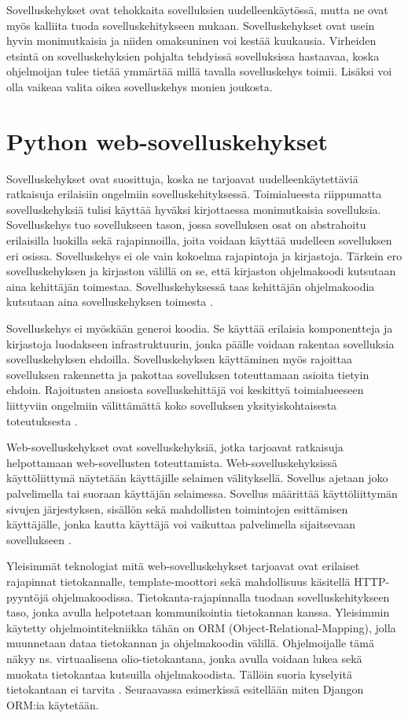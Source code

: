 \documentclass[utf8]{gradu3}
\begin{document}
Sovelluskehykset ovat tehokkaita sovelluksien uudelleenkäytössä, mutta ne ovat myös kalliita tuoda sovelluskehitykseen mukaan. Sovelluskehykset ovat usein hyvin monimutkaisia ja niiden omaksuninen voi kestää kuukausia. Virheiden etsintä on sovelluskehyksien pohjalta tehdyissä sovelluksissa hastaavaa, koska ohjelmoijan tulee tietää ymmärtää millä tavalla sovelluskehys toimii. Lisäksi voi olla vaikeaa valita oikea sovelluskehys monien joukosta. 

\chapter{Python web-sovelluskehykset}
Sovelluskehykset ovat suosittuja, koska ne tarjoavat uudelleenkäytettäviä ratkaisuja erilaisiin ongelmiin sovelluskehityksessä. Toimialueesta riippumatta sovelluskehyksiä tulisi käyttää hyväksi kirjottaessa monimutkaisia sovelluksia. Sovelluskehys tuo sovellukseen tason, jossa sovelluksen osat on abstrahoitu erilaisilla luokilla sekä rajapinnoilla, joita voidaan käyttää uudelleen sovelluksen eri osissa. Sovelluskehys ei ole vain kokoelma rajapintoja ja kirjastoja\parencite{towards_framework}. Tärkein ero sovelluskehyksen ja kirjaston välillä on se, että kirjaston ohjelmakoodi kutsutaan aina
kehittäjän toimestaa. Sovelluskehyksessä taas kehittäjän ohjelmakoodia kutsutaan aina sovelluskehyksen toimesta \parencite{pyramid_intr}.

Sovelluskehys ei myöskään generoi koodia. Se käyttää erilaisia komponentteja ja kirjastoja luodakseen infrastruktuurin, jonka päälle voidaan rakentaa sovelluksia sovelluskehyksen ehdoilla. Sovelluskehyksen käyttäminen myös rajoittaa sovelluksen rakennetta ja pakottaa sovelluksen toteuttamaan asioita tietyin ehdoin. Rajoitusten ansiosta sovelluskehittäjä voi keskittyä toimialueeseen liittyviin ongelmiin välittämättä koko sovelluksen yksityiskohtaisesta toteutuksesta \parencite{towards_framework}.

Web-sovelluskehykset ovat sovelluskehyksiä, jotka tarjoavat ratkaisuja helpottamaan web-sovellusten toteuttamista. Web-sovelluskehyksissä käyttöliittymä näytetään käyttäjille selaimen välityksellä. Sovellus ajetaan joko palvelimella tai suoraan käyttäjän selaimessa. Sovellus määrittää käyttöliittymän sivujen järjestyksen, sisällön sekä mahdollisten toimintojen esittämisen käyttäjälle, jonka kautta käyttäjä voi vaikuttaa palvelimella sijaitsevaan sovellukseen \parencite{vosloo}. 

Yleisimmät teknologiat mitä web-sovelluskehykset tarjoavat ovat erilaiset rajapinnat tietokannalle, template-moottori sekä mahdollisuus käsitellä HTTP-pyyntöjä ohjelmakoodissa. Tietokanta-rajapinnalla tuodaan sovelluskehitykseen taso, jonka avulla helpotetaan kommunikointia tietokannan kanssa. Yleisimmin käytetty ohjelmointitekniikka tähän on ORM (Object-Relational-Mapping), jolla muunnetaan dataa tietokannan ja ohjelmakoodin välillä. Ohjelmoijalle tämä näkyy ns. virtuaalisena olio-tietokantana, jonka avulla voidaan lukea sekä muokata tietokantaa kutsuilla ohjelmakoodista. Tällöin suoria kyselyitä tietokantaan ei tarvita \parencite{Ghandeharizadeh}. Seuraavassa esimerkissä esitellään miten Djangon ORM:ia käytetään.
\end{document}
